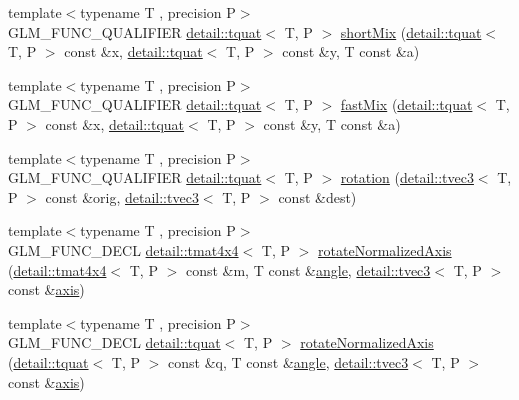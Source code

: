 \begin{DoxyCompactItemize}
\item 
{\footnotesize template$<$typename T , precision P$>$ }\\G\+L\+M\+\_\+\+F\+U\+N\+C\+\_\+\+Q\+U\+A\+L\+I\+F\+I\+ER \hyperlink{structglm_1_1detail_1_1tquat}{detail\+::tquat}$<$ T, P $>$ \hyperlink{group__gtx__quaternion_ga297f92682708e59bda1849ca3aad0fea}{short\+Mix} (\hyperlink{structglm_1_1detail_1_1tquat}{detail\+::tquat}$<$ T, P $>$ const \&x, \hyperlink{structglm_1_1detail_1_1tquat}{detail\+::tquat}$<$ T, P $>$ const \&y, T const \&a)
\item 
{\footnotesize template$<$typename T , precision P$>$ }\\G\+L\+M\+\_\+\+F\+U\+N\+C\+\_\+\+Q\+U\+A\+L\+I\+F\+I\+ER \hyperlink{structglm_1_1detail_1_1tquat}{detail\+::tquat}$<$ T, P $>$ \hyperlink{group__gtx__quaternion_ga5d1bb2670d0c73fff5912134ba7c024c}{fast\+Mix} (\hyperlink{structglm_1_1detail_1_1tquat}{detail\+::tquat}$<$ T, P $>$ const \&x, \hyperlink{structglm_1_1detail_1_1tquat}{detail\+::tquat}$<$ T, P $>$ const \&y, T const \&a)
\item 
{\footnotesize template$<$typename T , precision P$>$ }\\G\+L\+M\+\_\+\+F\+U\+N\+C\+\_\+\+Q\+U\+A\+L\+I\+F\+I\+ER \hyperlink{structglm_1_1detail_1_1tquat}{detail\+::tquat}$<$ T, P $>$ \hyperlink{group__gtx__quaternion_ga964b26fdcd9f6f694c1003b0571092a6}{rotation} (\hyperlink{structglm_1_1detail_1_1tvec3}{detail\+::tvec3}$<$ T, P $>$ const \&orig, \hyperlink{structglm_1_1detail_1_1tvec3}{detail\+::tvec3}$<$ T, P $>$ const \&dest)
\item 
{\footnotesize template$<$typename T , precision P$>$ }\\G\+L\+M\+\_\+\+F\+U\+N\+C\+\_\+\+D\+E\+CL \hyperlink{structglm_1_1detail_1_1tmat4x4}{detail\+::tmat4x4}$<$ T, P $>$ \hyperlink{group__gtx__rotate__normalized__axis_gac47b4efcecdaf7e892b10ae89135c544}{rotate\+Normalized\+Axis} (\hyperlink{structglm_1_1detail_1_1tmat4x4}{detail\+::tmat4x4}$<$ T, P $>$ const \&m, T const \&\hyperlink{group__gtc__quaternion_ga23a3fc7ada5bbb665ff84c92c6e0542c}{angle}, \hyperlink{structglm_1_1detail_1_1tvec3}{detail\+::tvec3}$<$ T, P $>$ const \&\hyperlink{group__gtc__quaternion_ga8eef9f8c3f2e4836dccf09df975b20fb}{axis})
\item 
{\footnotesize template$<$typename T , precision P$>$ }\\G\+L\+M\+\_\+\+F\+U\+N\+C\+\_\+\+D\+E\+CL \hyperlink{structglm_1_1detail_1_1tquat}{detail\+::tquat}$<$ T, P $>$ \hyperlink{group__gtx__rotate__normalized__axis_ga774f0f09fc99b3a967001cb116aa7f2a}{rotate\+Normalized\+Axis} (\hyperlink{structglm_1_1detail_1_1tquat}{detail\+::tquat}$<$ T, P $>$ const \&q, T const \&\hyperlink{group__gtc__quaternion_ga23a3fc7ada5bbb665ff84c92c6e0542c}{angle}, \hyperlink{structglm_1_1detail_1_1tvec3}{detail\+::tvec3}$<$ T, P $>$ const \&\hyperlink{group__gtc__quaternion_ga8eef9f8c3f2e4836dccf09df975b20fb}{axis})

\end{DoxyCompactItemize}
